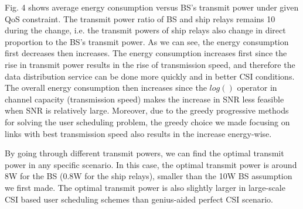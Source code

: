 \documentclass[conference]{IEEEtran}
\begin{document}
 Fig. 4 shows average energy consumption versus BS's transmit power under given QoS constraint. The transmit power ratio of BS and ship relays remains 10 during the change, i.e. the transmit powers of ship relays also change in direct proportion to the BS's transmit power. 
 As we can see, the energy consumption first decreases then increases. 
 The energy consumption increases first since the rise in transmit power results in the rise of transmission speed, and therefore the data distribution service can be done more quickly and in better CSI conditions. 
 The overall energy consumption then increases since the $log\left({}\right)$ operator in channel capacity (transmission speed) makes the increase in SNR less feasible when SNR is relatively large. Moreover, due to the greedy progressive methods for solving the user scheduling problem, the greedy choice we made focusing on links with best transmission speed also results in the increase energy-wise. 
 
 By going through different transmit powers, we can find the optimal transmit power in any specific scenario. In this case, the optimal transmit power is around 8W for the BS (0.8W for the ship relays), smaller than the 10W BS assumption we first made. The optimal transmit power is also slightly larger in large-scale CSI based user scheduling schemes than genius-aided perfect CSI scenario. 
 
 
 
\end{document}
